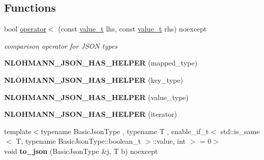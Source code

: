 \subsection*{Functions}
\begin{DoxyCompactItemize}
\item 
bool \hyperlink{namespacenlohmann_1_1detail_a09169efff3bd1771fff29bd92cea19e0}{operator$<$} (const \hyperlink{namespacenlohmann_1_1detail_a90aa5ef615aa8305e9ea20d8a947980f}{value\+\_\+t} lhs, const \hyperlink{namespacenlohmann_1_1detail_a90aa5ef615aa8305e9ea20d8a947980f}{value\+\_\+t} rhs) noexcept
\begin{DoxyCompactList}\small\item\em comparison operator for J\+S\+ON types \end{DoxyCompactList}\item 
{\bfseries N\+L\+O\+H\+M\+A\+N\+N\+\_\+\+J\+S\+O\+N\+\_\+\+H\+A\+S\+\_\+\+H\+E\+L\+P\+ER} (mapped\+\_\+type)\hypertarget{namespacenlohmann_1_1detail_a7b2601c238073c43a07862768b319cf8}{}\label{namespacenlohmann_1_1detail_a7b2601c238073c43a07862768b319cf8}

\item 
{\bfseries N\+L\+O\+H\+M\+A\+N\+N\+\_\+\+J\+S\+O\+N\+\_\+\+H\+A\+S\+\_\+\+H\+E\+L\+P\+ER} (key\+\_\+type)\hypertarget{namespacenlohmann_1_1detail_ad19328f0c4ffe2890ecafb7c89e0355b}{}\label{namespacenlohmann_1_1detail_ad19328f0c4ffe2890ecafb7c89e0355b}

\item 
{\bfseries N\+L\+O\+H\+M\+A\+N\+N\+\_\+\+J\+S\+O\+N\+\_\+\+H\+A\+S\+\_\+\+H\+E\+L\+P\+ER} (value\+\_\+type)\hypertarget{namespacenlohmann_1_1detail_af3e900eb1e0b107c812f7babbb94e69e}{}\label{namespacenlohmann_1_1detail_af3e900eb1e0b107c812f7babbb94e69e}

\item 
{\bfseries N\+L\+O\+H\+M\+A\+N\+N\+\_\+\+J\+S\+O\+N\+\_\+\+H\+A\+S\+\_\+\+H\+E\+L\+P\+ER} (iterator)\hypertarget{namespacenlohmann_1_1detail_a6648328c4b1466fdc48f1fcfbff23e2f}{}\label{namespacenlohmann_1_1detail_a6648328c4b1466fdc48f1fcfbff23e2f}

\item 
{\footnotesize template$<$typename Basic\+Json\+Type , typename T , enable\+\_\+if\+\_\+t$<$ std\+::is\+\_\+same$<$ T, typename Basic\+Json\+Type\+::boolean\+\_\+t $>$\+::value, int $>$  = 0$>$ }\\void {\bfseries to\+\_\+json} (Basic\+Json\+Type \&j, T b) noexcept\hypertarget{namespacenlohmann_1_1detail_a1a804b98cbe89b7e44b698f2ca860490}{}\label{namespacenlohmann_1_1detail_a1a804b98cbe89b7e44b698f2ca860490}


\end{DoxyCompactItemize}
